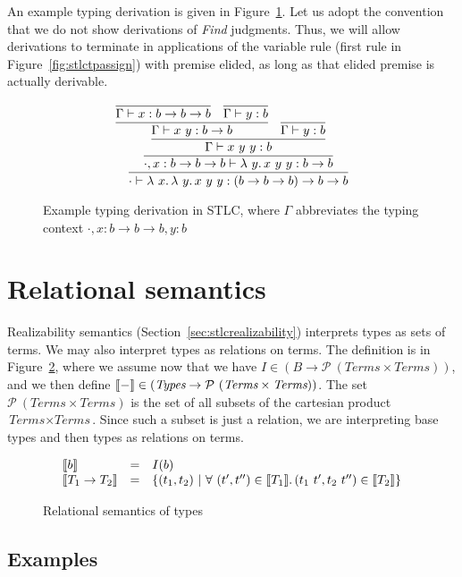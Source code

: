 An example typing derivation is given in Figure~\ref{fig:stlcex}.  Let us adopt the convention that
we do not show derivations of \textit{Find} judgments.  Thus, we will allow derivations to terminate
in applications of the variable rule (first rule in Figure~\ref{fig:stlctpassign}) with premise elided, as long
as that elided premise is actually derivable.

\begin{figure}
  \[
  \infer{\cdot \vdash \lam{x}{\lam{y}{x\ y\ y}} : (b \to b \to b) \to b \to b}
        {\infer{\cdot,x:b \to b \to b \vdash \lam{y}{x\ y\ y} : b \to b}
          {\infer{\Gamma \vdash x\ y\ y : b}
            {\infer{\Gamma \vdash x\ y : b \to b}
              {\infer{\Gamma \vdash x : b \to b \to b}{\ }
              & \infer{\Gamma \vdash y : b}{\ }}
            &\infer{\Gamma \vdash y : b}{\ }}}}
  \]
\caption{Example typing derivation in STLC, where $\Gamma$ abbreviates the typing context $\cdot,x:b \to b \to b, y : b$}
\label{fig:stlcex}
\end{figure}


\section{Relational semantics}

Realizability semantics (Section~\ref{sec:stlcrealizability})
interprets types as sets of terms.  We may also interpret types as
relations on terms.  The definition is in Figure~\ref{fig:relsemstlc},
where we assume now that we have $I \in (B \to
\mathcal{P}\ (\textit{Terms} \times \textit{Terms}))$, and we then
define $\llbracket - \rrbracket\in (\textit{Types} \to \mathcal{P}\ (\textit{Terms}
\times \textit{Terms}))$.  The set $\mathcal{P}\ (\textit{Terms} \times
\textit{Terms})$ is the set of all subsets of the cartesian product
$\textit{Terms} \times \textit{Terms}$.  Since such a subset is just a
relation, we are interpreting base types and then types as relations on
terms.

\begin{figure}
  \[
\begin{array}{lll}
   \llbracket b \rrbracket & = & I(b) \\
   \llbracket T_1\to T_2 \rrbracket & = & \{ (t_1,t_2)\ |\ \forall\ (t', t'') \in \llbracket T_1 \rrbracket.\, (t_1\ t', t_2\ t'') \in\llbracket T_2 \rrbracket \}
\end{array}
  \]
\caption{Relational semantics of types}
\label{fig:relsemstlc}
\end{figure}

\subsection{Examples}

